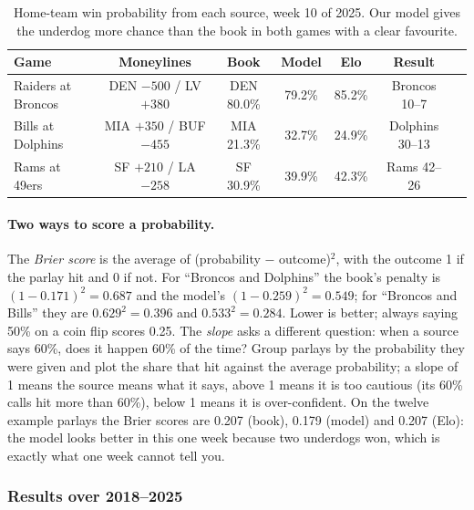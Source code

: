 \begin{table}[H]
\centering
\small
\begin{tabular}{lcccccl}
\toprule
\textbf{Game} & \textbf{Moneylines} & \textbf{Book} & \textbf{Model} & \textbf{Elo} & \textbf{Result} \\
\midrule
Raiders at Broncos & DEN $-500$ / LV $+380$ & DEN 80.0\% & 79.2\% & 85.2\% & Broncos 10--7 \\
Bills at Dolphins & MIA $+350$ / BUF $-455$ & MIA 21.3\% & 32.7\% & 24.9\% & Dolphins 30--13 \\
Rams at 49ers & SF $+210$ / LA $-258$ & SF 30.9\% & 39.9\% & 42.3\% & Rams 42--26 \\
\bottomrule
\end{tabular}
\caption{Home-team win probability from each source, week 10 of 2025. Our model gives the underdog more chance than the book in both games with a clear favourite.}
\label{tab:parlay_example}
\end{table}

\paragraph{Two ways to score a probability.} The \emph{Brier score} is the average of (probability $-$ outcome)$^2$, with the outcome 1 if the parlay hit and 0 if not. For ``Broncos and Dolphins'' the book's penalty is $(1-0.171)^2 = 0.687$ and the model's $(1-0.259)^2 = 0.549$; for ``Broncos and Bills'' they are $0.629^2 = 0.396$ and $0.533^2 = 0.284$. Lower is better; always saying 50\% on a coin flip scores 0.25. The \emph{slope} asks a different question: when a source says 60\%, does it happen 60\% of the time? Group parlays by the probability they were given and plot the share that hit against the average probability; a slope of 1 means the source means what it says, above 1 means it is too cautious (its 60\% calls hit more than 60\%), below 1 means it is over-confident. On the twelve example parlays the Brier scores are 0.207 (book), 0.179 (model) and 0.207 (Elo): the model looks better in this one week because two underdogs won, which is exactly what one week cannot tell you.

\subsubsection{Results over 2018--2025}

